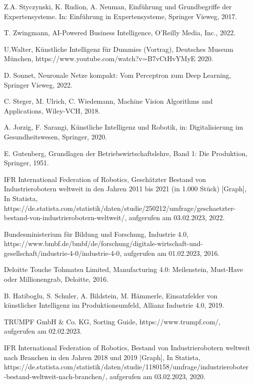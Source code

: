 \begin{thebibliography}{99}
	Z.A. Styczynski, K. Rudion, A. Neuman,
	Einführung und Grundbegriffe der Expertensysteme. In: Einführung in Expertensysteme,
	Springer Vieweg,
	2017.

	T. Zwingmann,
	AI-Powered Business Intelligence,
	O'Reilly Media, Inc.,
	2022.

	U.Walter,
	Künstliche Intelligenz für Dummies (Vortrag),
	Deutsches Museum München,
	https://www.youtube.com/watch?v=B7vCtHvYMyE
	2020.

	D. Sonnet,
	Neuronale Netze kompakt: Vom Perceptron zum Deep Learning,
	Springer Vieweg,
	2022.

	C. Steger, M. Ulrich, C. Wiedemann,
	Machine Vision Algorithms and Applications,
	Wiley-VCH,
	2018.

	A. Jorzig, F. Sarangi,
	Künstliche Intelligenz und Robotik, 
	in: Digitalisierung im Gesundheitswesen,
	Springer,
	2020.

	E. Gutenberg,
	Grundlagen der Betriebswirtschaftslehre, Band 1: Die Produktion,
	Springer,
	1951.

	IFR International Federation of Robotics,
	Geschätzter Bestand von Industrierobotern weltweit in den Jahren 2011 bis 2021 (in 1.000 Stück) [Graph],
	In Statista,
	https://de.statista.com/statistik/daten/studie/250212/umfrage/geschaetzter-bestand-von-industrierobotern-weltweit/,
	aufgerufen am 03.02.2023,
	2022.

	Bundesministerium für Bildung und Forschung,
	Industrie 4.0,
	https://www.bmbf.de/bmbf/de/forschung/digitale-wirtschaft-und-gesellschaft/industrie-4-0/industrie-4-0,
	aufgerufen am 01.02.2023,
	2016.

	Deloitte Touche Tohmatsu Limited,
	Manufacturing 4.0: Meilenstein, Must-Have oder Millionengrab,
	Deloitte,
	2016.

	B. Hatiboglu, S. Schuler, A. Bildstein, M. Hämmerle, 
	Einsatzfelder von künstlicher Intelligenz im Produktionsumfeld,
	Allianz Industrie 4.0, 
	2019.

	TRUMPF GmbH \& Co. KG,
	Sorting Guide,
	https://www.trumpf.com/,
	aufgerufen am 02.02.2023.

	IFR International Federation of Robotics,
	Bestand von Industrierobotern weltweit nach Branchen in den Jahren 2018 und 2019 [Graph],
	In Statista,
	https://de.statista.com/statistik/daten/studie/1180158/umfrage/industrieroboter-bestand-weltweit-nach-branchen/,
	aufgerufen am 03.02.2023,
	2020.


\end{thebibliography}
